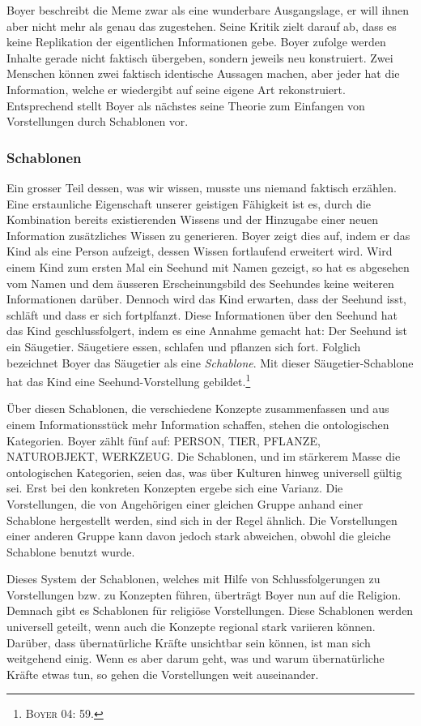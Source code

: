 Boyer beschreibt die Meme zwar als eine wunderbare Ausgangslage, er will ihnen aber nicht mehr als genau das zugestehen. Seine Kritik zielt darauf ab, dass es keine Replikation der eigentlichen Informationen gebe. Boyer zufolge werden Inhalte gerade nicht faktisch übergeben, sondern jeweils neu konstruiert. Zwei Menschen können zwei faktisch identische Aussagen machen, aber jeder hat die Information, welche er wiedergibt auf seine eigene Art rekonstruiert. Entsprechend stellt Boyer als nächstes seine Theorie zum Einfangen von Vorstellungen durch Schablonen vor.

\subsubsection{Schablonen}
Ein grosser Teil dessen, was wir wissen, musste uns niemand faktisch erzählen. Eine erstaunliche Eigenschaft unserer geistigen Fähigkeit ist es, durch die Kombination bereits existierenden Wissens und der Hinzugabe einer neuen Information zusätzliches Wissen zu generieren. Boyer zeigt dies auf, indem er das Kind als eine Person aufzeigt, dessen Wissen fortlaufend erweitert wird. Wird einem Kind zum ersten Mal ein Seehund mit Namen gezeigt, so hat es abgesehen vom Namen und dem äusseren Erscheinungsbild des Seehundes keine weiteren Informationen darüber. Dennoch wird das Kind erwarten, dass der Seehund isst, schläft und dass er sich fortplfanzt. Diese Informationen über den Seehund hat das Kind geschlussfolgert, indem es eine Annahme gemacht hat: Der Seehund ist ein Säugetier. Säugetiere essen, schlafen und pflanzen sich fort. Folglich bezeichnet Boyer das Säugetier als eine \emph{Schablone}. Mit dieser Säugetier-Schablone hat das Kind eine Seehund-Vorstellung gebildet.\footnote{\textsc{Boyer 04: 59.}} 

Über diesen Schablonen, die verschiedene Konzepte zusammenfassen und aus einem Informationsstück mehr Information schaffen, stehen die ontologischen Kategorien. Boyer zählt fünf auf: PERSON, TIER, PFLANZE, NATUROBJEKT, WERKZEUG. Die Schablonen, und im stärkerem Masse die ontologischen Kategorien, seien das, was über Kulturen hinweg universell gültig sei. Erst bei den konkreten Konzepten ergebe sich eine Varianz. Die Vorstellungen, die von Angehörigen einer gleichen Gruppe anhand einer Schablone hergestellt werden, sind sich in der Regel ähnlich. Die Vorstellungen einer anderen Gruppe kann davon jedoch stark abweichen, obwohl die gleiche Schablone benutzt wurde. 

Dieses System der Schablonen, welches mit Hilfe von Schlussfolgerungen zu Vorstellungen bzw. zu Konzepten führen, überträgt Boyer nun auf die Religion. Demnach gibt es Schablonen für religiöse Vorstellungen. Diese Schablonen werden universell geteilt, wenn auch die Konzepte regional stark variieren können. Darüber, dass übernatürliche Kräfte unsichtbar sein können, ist man sich weitgehend einig. Wenn es aber darum geht, was und warum übernatürliche Kräfte etwas tun, so gehen die Vorstellungen weit auseinander. 


